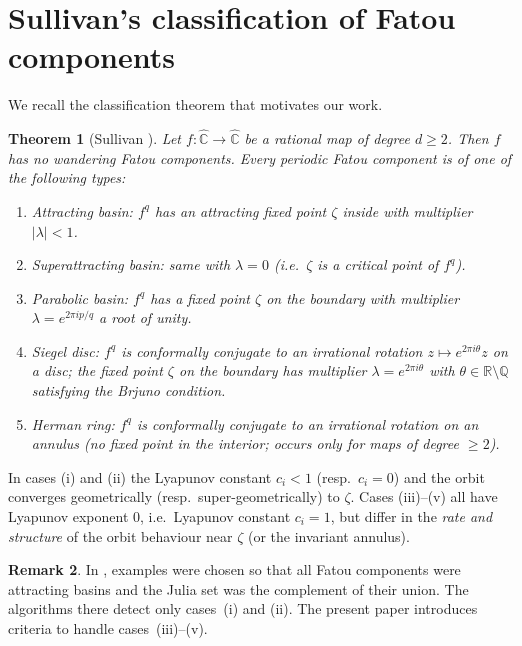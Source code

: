 \documentclass[12pt]{article}
\newtheorem{theorem}{Theorem}[section]
\theoremstyle{definition}
\newtheorem{remark}[theorem]{Remark}
\newcommand{\C}{\mathbb{C}}
\newcommand{\R}{\mathbb{R}}
\newcommand{\Q}{\mathbb{Q}}
\newcommand{\Chat}{\hat{\C}}
\begin{document}
\section{Sullivan's classification of Fatou components}
\label{sec:sullivan}

We recall the classification theorem that motivates our work.

\begin{theorem}[Sullivan \cite{Sullivan1983}]
  Let $f:\Chat\to\Chat$ be a rational map of degree $d\ge 2$.  Then $f$
  has no wandering Fatou components.  Every periodic Fatou component is of
  one of the following types:
  \begin{enumerate}[label=(\roman*)]
    \item \emph{Attracting basin}: $f^q$ has an attracting fixed point
          $\zeta$ inside with multiplier $|\lambda|<1$.
    \item \emph{Superattracting basin}: same with $\lambda=0$
          (i.e.~$\zeta$ is a critical point of $f^q$).
    \item \emph{Parabolic basin}: $f^q$ has a fixed point $\zeta$ on the
          boundary with multiplier $\lambda=e^{2\pi ip/q}$ a root of unity.
    \item \emph{Siegel disc}: $f^q$ is conformally conjugate to an
          irrational rotation $z\mapsto e^{2\pi i\theta}z$ on a disc; the
          fixed point $\zeta$ on the boundary has multiplier
          $\lambda=e^{2\pi i\theta}$ with $\theta\in\R\setminus\Q$
          satisfying the Brjuno condition.
    \item \emph{Herman ring}: $f^q$ is conformally conjugate to an
          irrational rotation on an annulus (no fixed point in the interior;
          occurs only for maps of degree $\ge 2$).
  \end{enumerate}
\end{theorem}

In cases (i) and (ii) the Lyapunov constant $c_i < 1$ (resp.~$c_i = 0$)
and the orbit converges geometrically (resp.~super-geometrically) to
$\zeta$.  Cases (iii)--(v) all have Lyapunov exponent $0$, i.e.~Lyapunov
constant $c_i = 1$, but differ in the \emph{rate and structure} of the
orbit behaviour near $\zeta$ (or the invariant annulus).

\begin{remark}\label{rem:previous}
  In \cite{Alvarez2023}, examples were chosen so that all Fatou components
  were attracting basins and the Julia set was the complement of their
  union.  The algorithms there detect only cases~(i) and (ii).  The present
  paper introduces criteria to handle cases~(iii)--(v).
\end{remark}
\end{document}
